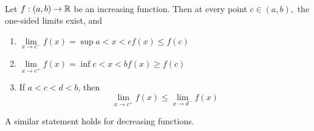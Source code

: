 \begin{theorem} \leavevmode \\
    \label{thm4.29}
    Let $f:(a,b) \to \mathbb{R}$ be an increasing function. Then at every point $c \in (a,b),$ the one-sided limits exist, and 
    \begin{enumerate} [$(i)$]
        \item $\lim \limits_{x \to c^-}f(x) = \sup \limits{a < x < c}f(x) \leq f(c)$
        \item $\lim \limits_{x \to c^+}f(x) = \inf \limits{c < x < b}f(x) \geq f(c)$
        \item If $a < c < d < b$, then 
        $$\lim \limits_{x \to c^+}f(x) \leq \lim \limits_{x \to d^-}f(x)$$
    \end{enumerate}
    A similar statement holds for decreasing functions.
\end{theorem}